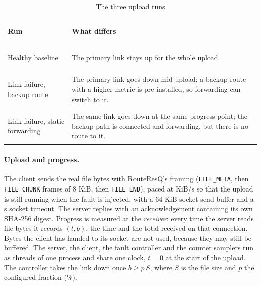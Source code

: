 \documentclass[12pt,a4paper]{report}
\numberwithin{equation}{chapter}
\newcommand{\tighttable}{\renewcommand{\arraystretch}{1.18}}
\begin{document}
\begin{table}[H]
\centering
\caption{The three upload runs}
\label{tab:uploadruns}
\tighttable
\begin{tabularx}{\textwidth}{>{\bfseries\raggedright\arraybackslash}p{}X}
\toprule
Run & What differs\\
\midrule
Healthy baseline & The primary link stays up for the whole upload.\\
Link failure, backup route & The primary link goes down mid-upload; a backup route with a higher metric is pre-installed, so forwarding can switch to it.\\
Link failure, static forwarding & The same link goes down at the same progress point; the backup path is connected and forwarding, but there is no route to it.\\
\bottomrule
\end{tabularx}
\end{table}

\paragraph{Upload and progress.} The client sends the real file bytes with RouteResQ's framing (\texttt{FILE\_META}, then \texttt{FILE\_CHUNK} frames of 8 KiB, then \texttt{FILE\_END}), paced at \upRate{} KiB/s so that the upload is still running when the fault is injected, with a 64 KiB socket send buffer and a \upTimeout{} s socket timeout. The server replies with an acknowledgement containing its own SHA-256 digest. Progress is measured at the \emph{receiver}: every time the server reads file bytes it records $(t, b)$, the time and the total received on that connection. Bytes the client has handed to its socket are not used, because they may still be buffered. The server, the client, the fault controller and the counter samplers run as threads of one process and share one clock, $t=0$ at the start of the upload. The controller takes the link down once $b \ge p\,S$, where $S$ is the file size and $p$ the configured fraction (\upFaultPct\%).
\end{document}
